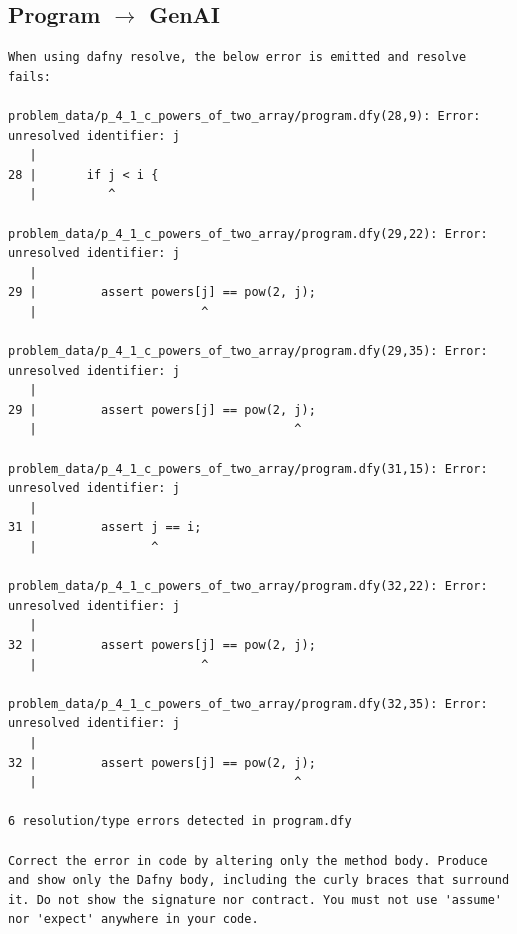 \documentclass{article}
\begin{document}
\subsection*{Program $\rightarrow$ GenAI}
\begin{lstlisting}
When using dafny resolve, the below error is emitted and resolve fails:

problem_data/p_4_1_c_powers_of_two_array/program.dfy(28,9): Error: unresolved identifier: j
   |
28 |       if j < i {
   |          ^

problem_data/p_4_1_c_powers_of_two_array/program.dfy(29,22): Error: unresolved identifier: j
   |
29 |         assert powers[j] == pow(2, j);
   |                       ^

problem_data/p_4_1_c_powers_of_two_array/program.dfy(29,35): Error: unresolved identifier: j
   |
29 |         assert powers[j] == pow(2, j);
   |                                    ^

problem_data/p_4_1_c_powers_of_two_array/program.dfy(31,15): Error: unresolved identifier: j
   |
31 |         assert j == i;
   |                ^

problem_data/p_4_1_c_powers_of_two_array/program.dfy(32,22): Error: unresolved identifier: j
   |
32 |         assert powers[j] == pow(2, j);
   |                       ^

problem_data/p_4_1_c_powers_of_two_array/program.dfy(32,35): Error: unresolved identifier: j
   |
32 |         assert powers[j] == pow(2, j);
   |                                    ^

6 resolution/type errors detected in program.dfy

Correct the error in code by altering only the method body. Produce and show only the Dafny body, including the curly braces that surround it. Do not show the signature nor contract. You must not use 'assume' nor 'expect' anywhere in your code.
\end{lstlisting}
\end{document}
